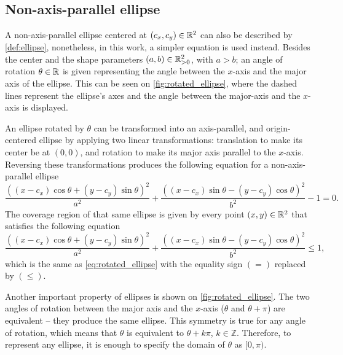 \subsection{Non-axis-parallel ellipse}

A non-axis-parallel ellipse centered at $(c_x, c_y)\in\mathbb{R}^2$ can also be described by \autoref{def:ellipse}, nonetheless, in this work,  a simpler equation is used instead. 
Besides the center and the shape parameters $(a, b) \in \mathbb{R}^2_{>0}$, with $a > b$; an angle of rotation $\theta \in \mathbb{R}$ is given representing the angle between the $x$-axis and the major axis of the ellipse. This can be seen on \autoref{fig:rotated_ellipse}, where the dashed lines represent the ellipse's axes and the angle between the major-axis and the $x$-axis is displayed.

An ellipse rotated by $\theta$ can be transformed into an axis-parallel, and origin-centered ellipse by applying two linear transformations: translation to make its center be at $(0, 0)$, and rotation to make its major axis parallel to the $x$-axis. Reversing these transformations produces the following equation for a non-axis-parallel ellipse
\begin{equation}\label{eq:rotated_ellipse}
\dfrac{((x-c_x)\cos\theta + (y-c_y)\sin\theta)^2}{a^2}+\dfrac{((x-c_x)\sin\theta - (y-c_y)\cos\theta)^2}{b^2}-1=0.
\end{equation}
The coverage region of that same ellipse is given by every point $(x, y)\in\mathbb{R}^2$ that satisfies the following equation
\begin{equation}\label{eq:rotated_ellipse_co}
\dfrac{((x-c_x)\cos\theta + (y-c_y)\sin\theta)^2}{a^2}+\dfrac{((x-c_x)\sin\theta - (y-c_y)\cos\theta)^2}{b^2}\le 1,
\end{equation}
which is the same as \autoref{eq:rotated_ellipse} with the equality sign $(=)$ replaced by $(\le)$.

Another important property of ellipses is shown on \autoref{fig:rotated_ellipse}. The two angles of rotation between the major axis and the $x$-axis ($\theta$ and $\theta+\pi$) are equivalent -- they produce the same ellipse. This symmetry is true for any angle of rotation, which means that $\theta$ is equivalent to $\theta+k\pi$, $k\in\mathbb{Z}$. Therefore, to represent any ellipse, it is enough to specify the domain of $\theta$ as $[0, \pi)$.

